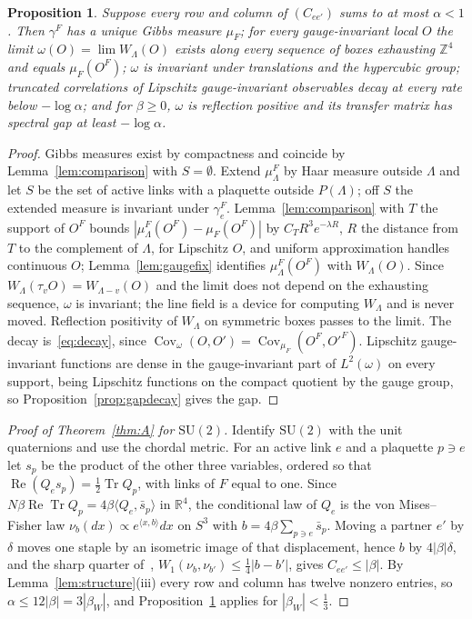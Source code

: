 \documentclass[11pt]{amsart}
\newtheorem{proposition}[theorem]{Proposition}
\theoremstyle{definition}
\theoremstyle{remark}
\numberwithin{equation}{section}
\newcommand{\R}{\mathbb{R}}
\newcommand{\Z}{\mathbb{Z}}
\newcommand{\SU}{\mathrm{SU}}
\newcommand{\Tr}{\operatorname{Tr}}
\newcommand{\ReTr}{\operatorname{Re}\operatorname{Tr}}
\newcommand{\Cov}{\operatorname{Cov}}
\newcommand{\ip}[2]{\langle #1,#2\rangle}
\begin{document}
\begin{proposition}\label{prop:state}
Suppose every row and column of $(C_{ee'})$ sums to at most $\alpha<1$. Then
$\gamma^F$ has a unique Gibbs measure $\mu_F$; for every gauge-invariant local $O$
the limit $\omega(O)=\lim W_\Lambda(O)$ exists along every sequence of boxes
exhausting $\Z^4$ and equals $\mu_F(O^F)$; $\omega$ is invariant under
translations and the hypercubic group; truncated correlations of Lipschitz
gauge-invariant observables decay at every rate below $-\log\alpha$; and for
$\beta\ge0$, $\omega$ is reflection positive and its transfer matrix has
spectral gap at least $-\log\alpha$.
\end{proposition}

\begin{proof}
Gibbs measures exist by compactness and coincide by Lemma~\ref{lem:comparison}
with $S=\emptyset$. Extend $\mu^F_\Lambda$ by Haar measure outside $\Lambda$ and
let $S$ be the set of active links with a plaquette outside $P(\Lambda)$; off $S$
the extended measure is invariant under $\gamma^F_e$. Lemma~\ref{lem:comparison}
with $T$ the support of $O^F$ bounds $|\mu^F_\Lambda(O^F)-\mu_F(O^F)|$ by
$C_TR^3e^{-\lambda R}$, $R$ the distance from $T$ to the complement of $\Lambda$,
for Lipschitz $O$, and uniform approximation handles continuous $O$;
Lemma~\ref{lem:gaugefix} identifies $\mu^F_\Lambda(O^F)$ with $W_\Lambda(O)$. Since
$W_\Lambda(\tau_vO)=W_{\Lambda-v}(O)$ and the limit does not depend on the
exhausting sequence, $\omega$ is invariant; the line field is a device for
computing $W_\Lambda$ and is never moved. Reflection positivity of $W_\Lambda$ on
symmetric boxes passes to the limit. The decay is~\eqref{eq:decay}, since
$\Cov_\omega(O,O')=\Cov_{\mu_F}(O^F,O'^F)$. Lipschitz gauge-invariant functions
are dense in the gauge-invariant part of $L^2(\omega)$ on every support, being
Lipschitz functions on the compact quotient by the gauge group, so
Proposition~\ref{prop:gapdecay} gives the gap.
\end{proof}

\begin{proof}[Proof of Theorem~\ref{thm:A} for $\SU(2)$]
Identify $\SU(2)$ with the unit quaternions and use the chordal metric. For an
active link $e$ and a plaquette $p\ni e$ let $s_p$ be the product of the other
three variables, ordered so that $\operatorname{Re}(Q_es_p)=\frac12\Tr Q_p$, with
links of $F$ equal to one. Since $N\beta\ReTr Q_p=4\beta\ip{Q_e}{\bar s_p}$ in
$\R^4$, the conditional law of $Q_e$ is the von Mises--Fisher law $\nu_b(dx)
\propto e^{\ip xb}dx$ on $S^3$ with $b=4\beta\sum_{p\ni e}\bar s_p$. Moving a
partner $e'$ by $\delta$ moves one staple by an isometric image of that
displacement, hence $b$ by $4|\beta|\delta$, and the sharp
quarter of~\cite{BB26a}, $W_1(\nu_b,\nu_{b'})\le\frac14|b-b'|$, gives
$C_{ee'}\le|\beta|$. By Lemma~\ref{lem:structure}(iii) every row and column has
twelve nonzero entries, so $\alpha\le12|\beta|=3|\beta_W|$, and
Proposition~\ref{prop:state} applies for $|\beta_W|<\frac13$.
\end{proof}
\end{document}
